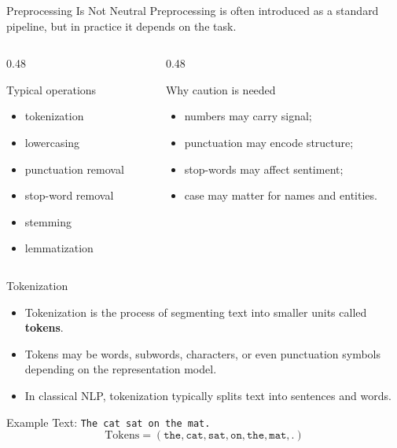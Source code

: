 \documentclass[aspectratio=169]{beamer}
\begin{document}
\begin{frame}{Preprocessing Is Not Neutral}
Preprocessing is often introduced as a standard pipeline, but in practice it depends on the task.

\vspace{0.15cm}
\begin{columns}[T]
\begin{column}{0.48\textwidth}
\begin{block}{Typical operations}
\begin{itemize}
    \item tokenization
    \item lowercasing
    \item punctuation removal
    \item stop-word removal
    \item stemming
    \item lemmatization
\end{itemize}
\end{block}
\end{column}
\begin{column}{0.48\textwidth}
\begin{block}{Why caution is needed}
\begin{itemize}
    \item numbers may carry signal;
    \item punctuation may encode structure;
    \item stop-words may affect sentiment;
    \item case may matter for names and entities.
\end{itemize}
\end{block}
\end{column}
\end{columns}
\end{frame}
%
%
\begin{frame}{Tokenization}
\begin{itemize}
    \item Tokenization is the process of segmenting text into smaller units called \textbf{tokens}.
    \item Tokens may be words, subwords, characters, or even punctuation symbols depending on the representation model.
    \item In classical NLP, tokenization typically splits text into sentences and words.
\end{itemize}

\vspace{0.2cm}
\begin{block}{Example}
Text: \texttt{The cat sat on the mat.}
\[
\text{Tokens} = (\texttt{the},\texttt{cat},\texttt{sat},\texttt{on},\texttt{the},\texttt{mat},\texttt{.})
\]
\end{block}
\end{frame}
\end{document}
